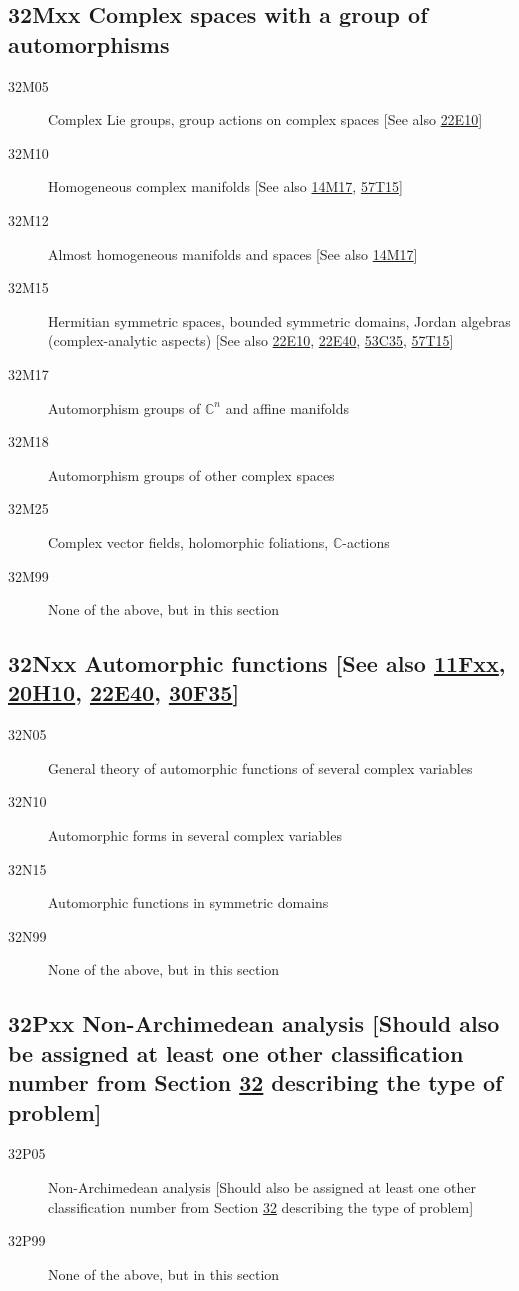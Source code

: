 \subsection*{32Mxx  Complex spaces with a group of automorphisms }\label{32Mxx}
\begin{description}  
\item [32M05]\label{32M05} Complex Lie groups, group actions on complex spaces [See also \hyperref[22E10]{22E10}]
\item [32M10]\label{32M10} Homogeneous complex manifolds [See also \hyperref[14M17]{14M17}, \hyperref[57T15]{57T15}]
\item [32M12]\label{32M12} Almost homogeneous manifolds and spaces [See also \hyperref[14M17]{14M17}]
\item [32M15]\label{32M15} Hermitian symmetric spaces, bounded symmetric domains, Jordan algebras (complex-analytic aspects) [See also \hyperref[22E10]{22E10}, \hyperref[22E40]{22E40}, \hyperref[53C35]{53C35}, \hyperref[57T15]{57T15}]
\item [32M17]\label{32M17} Automorphism groups of $\mathbb{C}^n$ and affine manifolds
\item [32M18]\label{32M18} Automorphism groups of other complex spaces
\item [32M25]\label{32M25} Complex vector fields, holomorphic foliations, $\mathbb{C}$-actions
\item [32M99]\label{32M99} None of the above, but in this section
\end{description}
\subsection*{32Nxx  Automorphic functions [See also \hyperref[11Fxx]{11Fxx}, \hyperref[20H10]{20H10}, \hyperref[22E40]{22E40}, \hyperref[30F35]{30F35}] }\label{32Nxx}
\begin{description}  
\item [32N05]\label{32N05} General theory of automorphic functions of several complex variables
\item [32N10]\label{32N10} Automorphic forms in several complex variables
\item [32N15]\label{32N15} Automorphic functions in symmetric domains
\item [32N99]\label{32N99} None of the above, but in this section
\end{description}
\subsection*{32Pxx  Non-Archimedean analysis [Should also be assigned at least one other classification number from Section \hyperref[32-XX]{32} describing the type of problem] }\label{32Pxx}
\begin{description}  
\item [32P05]\label{32P05} Non-Archimedean analysis [Should also be assigned at least one other classification number from Section \hyperref[32-XX]{32} describing the type of problem]
\item [32P99]\label{32P99} None of the above, but in this section
\end{description}
